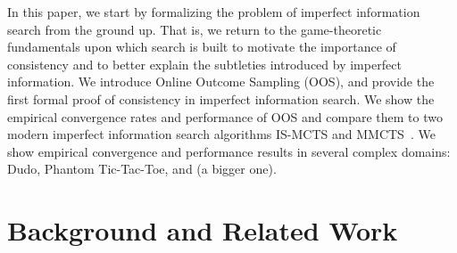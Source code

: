 \documentclass[letterpaper]{article}
\begin{document}
In this paper, we start by formalizing the problem of imperfect information search from the ground up. That is, we return to the game-theoretic 
fundamentals upon which search is built to motivate the importance of consistency and to better explain the subtleties introduced by imperfect 
information. 
We introduce Online Outcome Sampling (OOS), and provide the first formal proof of consistency in imperfect information search.
We show the empirical convergence rates and performance of OOS and compare them to two modern imperfect information search algorithms 
IS-MCTS and MMCTS~\cite{Cowling12ISMCTS,Auger11Multiple}.
We show empirical convergence and performance results in several complex domains: Dudo, Phantom Tic-Tac-Toe, and (a bigger one). 

\section{Background and Related Work}
\end{document}

